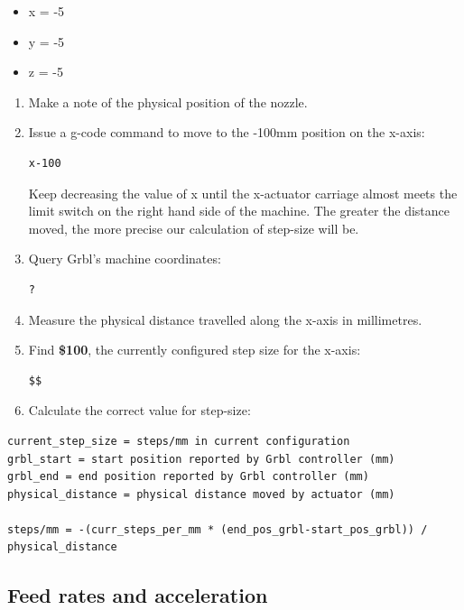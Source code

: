 \documentclass[]{book}
\providecommand{\tightlist}{%
  \setlength{\itemsep}{0pt}\setlength{\parskip}{0pt}}
\theoremstyle{definition}
\theoremstyle{definition}
\theoremstyle{definition}
\theoremstyle{remark}
\begin{document}
\begin{itemize}
\tightlist
\item
  x = -5
\item
  y = -5
\item
  z = -5
\end{itemize}

\begin{enumerate}
\def\labelenumi{\arabic{enumi}.}
\setcounter{enumi}{2}
\item
  Make a note of the physical position of the nozzle.
\item
  Issue a g-code command to move to the -100mm position on the x-axis:

\begin{verbatim}
x-100
\end{verbatim}

  Keep decreasing the value of x until the x-actuator carriage almost
  meets the limit switch on the right hand side of the machine. The
  greater the distance moved, the more precise our calculation of
  step-size will be.
\item
  Query Grbl's machine coordinates:

\begin{verbatim}
?
\end{verbatim}
\item
  Measure the physical distance travelled along the x-axis in
  millimetres.
\item
  Find \textbf{\$100}, the currently configured step size for the
  x-axis:

\begin{verbatim}
$$
\end{verbatim}
\item
  Calculate the correct value for step-size:
\end{enumerate}

\begin{verbatim}
current_step_size = steps/mm in current configuration
grbl_start = start position reported by Grbl controller (mm)
grbl_end = end position reported by Grbl controller (mm)
physical_distance = physical distance moved by actuator (mm)

steps/mm = -(curr_steps_per_mm * (end_pos_grbl-start_pos_grbl)) / physical_distance
\end{verbatim}

\subsection{Feed rates and
acceleration}\label{feed-rates-and-acceleration}
\end{document}

